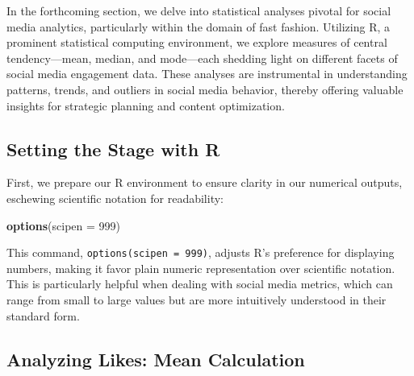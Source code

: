 \documentclass[
]{book}
\newenvironment{Shaded}{\begin{snugshade}}{\end{snugshade}}
\newcommand{\AttributeTok}[1]{\textcolor[rgb]{0.13,0.29,0.53}{#1}}
\newcommand{\CommentTok}[1]{\textcolor[rgb]{0.56,0.35,0.01}{\textit{#1}}}
\newcommand{\DecValTok}[1]{\textcolor[rgb]{0.00,0.00,0.81}{#1}}
\newcommand{\FunctionTok}[1]{\textcolor[rgb]{0.13,0.29,0.53}{\textbf{#1}}}
\newcommand{\NormalTok}[1]{#1}
\newcommand{\OtherTok}[1]{\textcolor[rgb]{0.56,0.35,0.01}{#1}}
\newcommand{\SpecialCharTok}[1]{\textcolor[rgb]{0.81,0.36,0.00}{\textbf{#1}}}
\newcommand{\StringTok}[1]{\textcolor[rgb]{0.31,0.60,0.02}{#1}}
\begin{document}
\begin{Shaded}
\end{Shaded}

In the forthcoming section, we delve into statistical analyses pivotal for social media analytics, particularly within the domain of fast fashion. Utilizing R, a prominent statistical computing environment, we explore measures of central tendency---mean, median, and mode---each shedding light on different facets of social media engagement data. These analyses are instrumental in understanding patterns, trends, and outliers in social media behavior, thereby offering valuable insights for strategic planning and content optimization.

\hypertarget{setting-the-stage-with-r}{%
\subsection{Setting the Stage with R}\label{setting-the-stage-with-r}}

First, we prepare our R environment to ensure clarity in our numerical outputs, eschewing scientific notation for readability:

\begin{Shaded}
\begin{Highlighting}[]
\FunctionTok{options}\NormalTok{(}\AttributeTok{scipen =} \DecValTok{999}\NormalTok{)}
\end{Highlighting}
\end{Shaded}

This command, \texttt{options(scipen\ =\ 999)}, adjusts R's preference for displaying numbers, making it favor plain numeric representation over scientific notation. This is particularly helpful when dealing with social media metrics, which can range from small to large values but are more intuitively understood in their standard form.

\hypertarget{analyzing-likes-mean-calculation}{%
\subsection{Analyzing Likes: Mean Calculation}\label{analyzing-likes-mean-calculation}}
\end{document}
